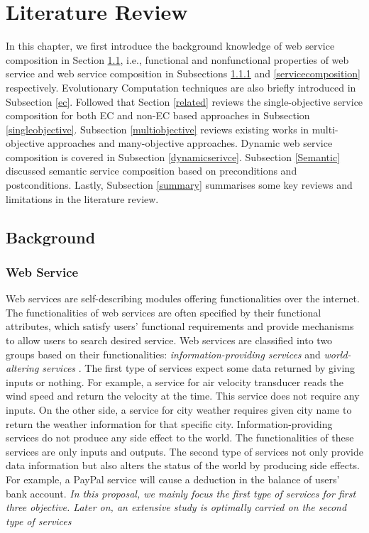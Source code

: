 \chapter{Literature Review}\label{C:review}
In this chapter, we first introduce the background knowledge of web service composition in Section \ref{background}, i.e., functional and nonfunctional properties of web service and web service composition in Subsections \ref{service} and \ref{servicecomposition} respectively. Evolutionary Computation techniques are also briefly introduced in Subsection \ref{ec}. Followed that Section \ref{related} reviews the single-objective service composition for both EC and non-EC based approaches in Subsection \ref{singleobjective}.  Subsection  \ref{multiobjective} reviews existing works in multi-objective approaches and many-objective approaches.  Dynamic web service composition is covered in Subsection \ref{dynamicserivce}. Subsection \ref{Semantic}  discussed semantic service composition based on preconditions and postconditions. Lastly, Subsection \ref{summary} summarises some key reviews and limitations in the literature review.
\section{Background}\label{background}

\subsection{Web Service}\label{service}
Web services are self-describing modules offering functionalities over the internet. The functionalities of web services are often specified by their functional attributes, which satisfy users' functional requirements and provide mechanisms to allow users to search desired service. Web services are classified into two groups based on their functionalities:  \emph{information-providing services} and \emph{world-altering services} \cite{mcilraith2001semantic}. The first type of services expect some data returned by giving inputs or nothing. For example, a service for air velocity transducer reads the wind speed and return the velocity at the time. This service does not require any inputs. On the other side, a service for city weather requires given city name to return the weather information for that specific city. Information-providing services do not produce any side effect to the world. The functionalities of these services are only inputs and outputs. The second type of services not only provide data information but also alters the status of the world by producing side effects. For example, a PayPal service will cause a deduction in the balance of users' bank account. \emph{In this proposal, we mainly focus the first type of services for first three objective. Later on, an extensive study is optimally carried on the second type of services}

